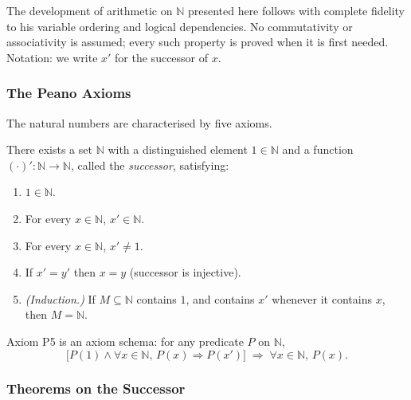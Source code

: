 The development of arithmetic on $\mathbb{N}$ presented here follows
\textcite{LandauFoundationsAnalysis} with complete fidelity to his variable
ordering and logical dependencies. No commutativity or associativity is
assumed; every such property is proved when it is first needed.
Notation: we write $x'$ for the successor of $x$.

\subsubsection*{The Peano Axioms}

The natural numbers are characterised by five axioms.

\begin{axiom}
\label{ax:landau-peano}
There exists a set $\mathbb{N}$ with a distinguished element $1 \in \mathbb{N}$
and a function $(\cdot)' : \mathbb{N} \to \mathbb{N}$, called the
\emph{successor}, satisfying:
\begin{enumerate}
  \item[\textbf{P1.}] $1 \in \mathbb{N}$.
  \item[\textbf{P2.}] For every $x \in \mathbb{N}$, $x' \in \mathbb{N}$.
  \item[\textbf{P3.}] For every $x \in \mathbb{N}$, $x' \neq 1$.
  \item[\textbf{P4.}] If $x' = y'$ then $x = y$ \quad (successor is injective).
  \item[\textbf{P5.}] \emph{(Induction.)} If $M \subseteq \mathbb{N}$ contains
        $1$, and contains $x'$ whenever it contains $x$, then
        $M = \mathbb{N}$.
\end{enumerate}
\end{axiom}

\begin{remark*}
Axiom P5 is an axiom schema: for any predicate $P$ on $\mathbb{N}$,
\[
  \bigl[P(1) \land \forall x \in \mathbb{N},\, P(x) \Rightarrow P(x')\bigr]
  \;\Rightarrow\;
  \forall x \in \mathbb{N},\, P(x).
\]
\end{remark*}

\subsubsection*{Theorems on the Successor}

